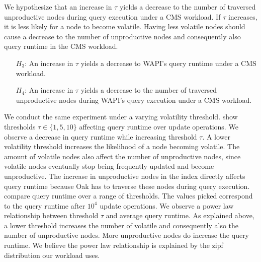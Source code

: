 \documentclass[abstracton,12pt]{scrartcl}
\theoremstyle{definition}
\begin{document}
We hypothesize that an increase in $\tau$ yields a decrease to the number of
traversed unproductive nodes during query execution under a CMS workload. If
$\tau$ increases, it is
less likely for a node to become volatile. Having less volatile nodes should
cause a decrease to the number of unproductive nodes and consequently also query
runtime in the CMS workload.

\begin{shaded}
  \begin{itemize}
  \item[$H_3$:] An increase in $\tau$ yields a decrease to WAPI's query runtime
    under a CMS workload. 
  \item[$H_4$:] An increase in $\tau$ yields a decrease to the number of
    traversed unproductive nodes during WAPI's query execution under a CMS workload.
  \end{itemize}
\end{shaded}

We conduct the same experiment under a varying volatility threshold. 
 show
thresholds $\tau \in \{1,5,10\}$ affecting query runtime
over update operations. We observe a decrease in query runtime
while increasing threshold $\tau$.
A lower volatility threshold increases the likelihood of a node
becoming volatile. The amount of volatile nodes also affect the number of
unproductive nodes, since volatile nodes eventually stop being frequently
updated and become unproductive. The increase in unproductive nodes in the index
directly affects query runtime because Oak has to traverse these nodes during
query execution.
 compare query
runtime over a range of thresholds. The values picked correspond to
the query runtime after $10^4$ update operations.
We observe a power law relationship between threshold $\tau$ and average query
runtime. As explained above, a lower threshold increases the number of volatile
and consequently also the number of unproductive nodes. More unproductive nodes
do increase the query runtime. We believe the power law relationship is
explained by the zipf distribution our workload uses. 
\end{document}
